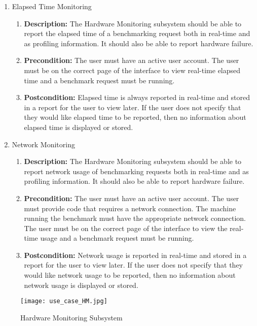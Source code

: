 \documentclass{article}
\begin{document}
\begin{enumerate}
\begin{enumerate}
        \item Elapsed Time Monitoring
		\begin{enumerate}
			\item \textbf{Description:} The Hardware Monitoring subsystem should be able to report the elapsed time of a benchmarking request both in real-time and as profiling information. It should also be able to report hardware failure.
			\item \textbf{Precondition:} The user must have an active user account. The user must be on the correct page of the interface to view real-time elapsed time and a benchmark request must be running. 
			\item \textbf{Postcondition:} Elapsed time is always reported in real-time and stored in a report for the user to view later. If the user does not specify that they would like elapsed time to be reported, then no information about elapsed time is displayed or stored.\newline
		\end{enumerate}
        
        \item Network Monitoring
		\begin{enumerate}
			\item \textbf{Description:} The Hardware Monitoring subsystem should be able to report network usage of benchmarking requests both in real-time and as profiling information. It should also be able to report hardware failure.
			\item \textbf{Precondition:} The user must have an active user account. The user must provide code that requires a network connection. The machine running the benchmark must have the appropriate network connection. The user must be on the correct page of the interface to view the real-time usage and a benchmark request must be running.
			\item \textbf{Postcondition:} Network usage is reported in real-time and stored in a report for the user to view later. If the user does not specify that they would like network usage to be reported, then no information about network usage is displayed or stored.\newline
		\end{enumerate}
        
	\end{enumerate}
	\begin{figure}[H]
    	\texttt{[image: use\_case\_HM.jpg]}
        \centering
		\caption{Hardware Monitoring Subsystem}	
	\end{figure}	
	

\end{enumerate}
\end{document}
